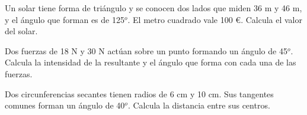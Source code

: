\vspace{-8mm}
\begin{flushright}
\begin{footnotesize} \textcolor{gris}{}	\end{footnotesize}
\end{flushright}

\begin{mipropuesto}
	
	Un solar tiene forma de triángulo y se conocen dos lados que miden 36 m y 46 m, y el ángulo que forman es de 125$^o$. El metro cuadrado vale 100 €. Calcula el valor del solar.
\end{mipropuesto}

\vspace{-8mm}
\begin{flushright}
\begin{footnotesize} \textcolor{gris}{}	\end{footnotesize}
\end{flushright}

\begin{mipropuesto}
	
	Dos fuerzas de 18 N y 30 N actúan sobre un punto formando un ángulo de 45$^o$. Calcula la intensidad de la resultante y el ángulo que forma con cada una de las fuerzas.
\end{mipropuesto}

\vspace{-8mm}
\begin{flushright}
\begin{footnotesize} \textcolor{gris}{}	\end{footnotesize}
\end{flushright}

\begin{mipropuesto}
	
	Dos circunferencias secantes tienen radios de 6 cm y 10 cm. Sus tangentes comunes forman un ángulo de 40$^o$. Calcula la distancia entre sus centros.
\end{mipropuesto}

\vspace{-8mm}
\begin{flushright}
\begin{footnotesize} \textcolor{gris}{}	\end{footnotesize}
\end{flushright}

